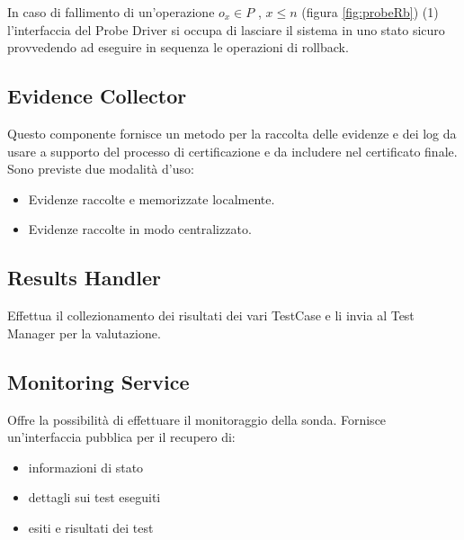 \documentclass[../main.tex]{subfiles}
\begin{document}
In caso di fallimento di un'operazione $o_x \in P$ , $x \leq n$ (figura \ref{fig:probeRb}) (1) l'interfaccia del Probe Driver si occupa di lasciare il sistema in uno stato sicuro provvedendo ad eseguire in sequenza le operazioni di rollback.

\subsection {Evidence Collector}
Questo componente fornisce un metodo per la raccolta delle evidenze e dei log da usare a supporto del processo di certificazione e da includere nel certificato finale.
Sono previste due modalità d'uso:
\begin{itemize}
\item Evidenze raccolte e memorizzate localmente.
\item Evidenze raccolte in modo centralizzato.
\end{itemize}

\subsection {Results Handler}
Effettua il collezionamento dei risultati dei vari TestCase e li invia al Test Manager per la valutazione.

\subsection {Monitoring Service}
Offre la possibilità di effettuare il monitoraggio della sonda. Fornisce un'interfaccia pubblica per il recupero di:
\begin{itemize}
\item informazioni di stato
\item dettagli sui test eseguiti
\item esiti e risultati dei test
\end{itemize}
\vfill
\newpage
\end{document}
